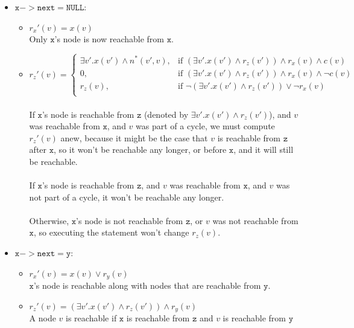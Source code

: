 \begin{itemize}
\begin{itemize}
	\item $\mathtt{x->next=NULL}$:
	\begin{itemize}
	\item $r_x'(v)=x(v)$ \\
	Only $\mathtt{x}$'s node is now reachable from $\mathtt{x}$.\\
	\item $r_z'(v)=\begin{cases}
	\exists v'.x(v')\land n^{*}(v',v), & \text{if } (\exists v'.x(v')\land r_z(v'))\land r_x(v)\land c(v)\\
	0, & \text{if } (\exists v'.x(v')\land r_z(v'))\land r_x(v)\land \neg c(v)\\
	r_z(v), & \text{if } \neg(\exists v'.x(v')\land r_z(v'))\lor \neg r_x(v)\\
	\end{cases} $\\ \\
	If $\mathtt{x}$'s node is reachable from $\mathtt{z}$ (denoted by $\exists v'.x(v')\land r_z(v')$), and $v$ was reachable from $\mathtt{x}$, and $v$ was part of a cycle, we must compute $r_z'(v)$ anew, because it might be the case that $v$ is reachable from $\mathtt{z}$ after $\mathtt{x}$, so it won't be reachable any longer, or before $\mathtt{x}$, and it will still be reachable.\\ \\
	If $\mathtt{x}$'s node is reachable from $\mathtt{z}$, and $v$ was reachable from $\mathtt{x}$, and $v$ was not part of a cycle, it won't be reachable any longer.\\ \\
	Otherwise, $\mathtt{x}$'s node is not reachable from $\mathtt{z}$, or $v$ was not reachable from $\mathtt{x}$, so executing the statement won't change $r_z(v)$.
	\end{itemize}
	\item $\mathtt{x->next=y}$:
	\begin{itemize}
	\item $r_x'(v)=x(v)\lor r_y(v)$ \\
	$\mathtt{x}$'s node is reachable along with nodes that are reachable from $\mathtt{y}$.\\
	\item $r_z'(v)=(\exists v'.x(v')\land r_z(v'))\land r_y(v)$ \\
	A node $v$ is reachable if $\mathtt{x}$ is reachable from $\mathtt{z}$ and $v$ is reachable from $\mathtt{y}$
	\end{itemize}

\end{itemize}
\end{itemize}
